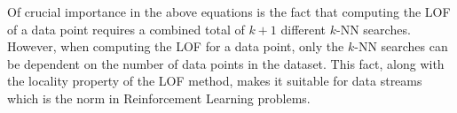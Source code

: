 \documentclass[../main.tex]{subfiles}
\begin{document}
Of crucial importance in the above equations is the fact that computing the LOF of a data point requires a combined total of $k + 1$ different $k$-NN searches. However, when computing the LOF for a data point, only the $k$-NN searches can be dependent on the number of data points in the dataset. This fact, along with the locality property of the LOF method, makes it suitable for data streams \cite{DBLP:conf/cidm/PokrajacLL07} which is the norm in Reinforcement Learning problems.
\end{document}
